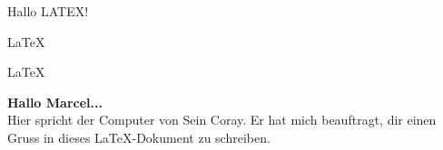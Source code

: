 \documentclass{article}
\begin{document}
Hallo LATEX!  

\LaTeX 

\huge
\LaTeX\\

\begin{center}

\textbf{Hallo Marcel...}\\
Hier spricht der Computer von Sein Coray. Er hat mich beauftragt, dir einen Gruss in dieses LaTeX-Dokument zu schreiben.
\end{center} 
   
\end{document}
